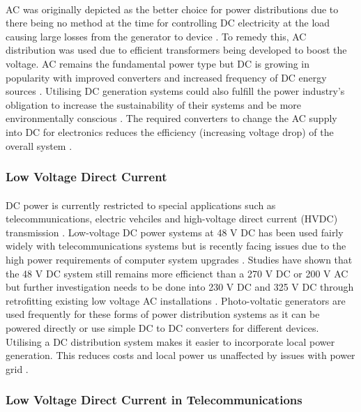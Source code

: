 \paragraph{}
AC was originally depicted as the better choice for power distributions due to there
being no method at the time for controlling DC electricity at the load causing large
losses from the generator to device \cite{Starke2008b}. To remedy this, AC distribution was used
due to efficient transformers being developed to boost the voltage. AC remains the
fundamental power type but DC is growing in popularity with improved converters and
increased frequency of DC energy sources \cite{Starke2008b}. Utilising DC generation systems could
also fulfill the power industry's obligation to increase the sustainability of their systems
and be more environmentally conscious \cite{Starke2008a}. The required converters to change the AC
supply into DC for electronics reduces the efficiency (increasing voltage drop) of the
overall system \cite{Starke2008b}.    

\subsubsection{Low Voltage Direct Current}

\paragraph{}
DC power is currently restricted to special applications such as telecommunications, electric vehciles and high-voltage direct current (HVDC) transmission \cite{Salomonsson2007}. Low-voltage DC power systems at 48 V DC has been used fairly widely with telecommunications systems but is recently facing issues due to the high power requirements of computer system upgrades \cite{Salomonsson2007}. Studies have shown that the 48 V DC system still remains more efficienct than a 270 V DC or 200 V AC but further investigation needs to be done into 230 V DC and 325 V DC through retrofitting existing low voltage AC installations \cite{Salomonsson2007}. Photo-voltatic generators are used frequently for these forms of power distribution systems as it can be powered directly or use simple DC to DC converters for different devices. Utilising a DC distribution system makes it easier to incorporate local power generation. This reduces costs and local power us unaffected by issues with power grid \cite{Starke2008a}. 

\subsubsection{Low Voltage Direct Current in Telecommunications}

